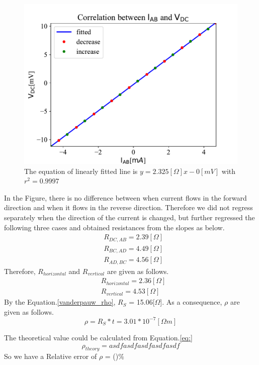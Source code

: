 \documentclass[5p,sort&compress]{elsarticle}
\begin{document}
\begin{figure}[h]
\centering
\includegraphics[width=.5\textwidth]{platinum_ABDC_VI.pdf}
\caption{The equation of linearly fitted line is $y = 2.325[\Omega]x - 0[mV]$ with $r^2 = 0.9997$}
\label{fig:ABDC}
\end{figure}
In the Figure, there is no difference between when current flows in the forward direction and when it flows in the reverse direction. Therefore we did not regress separately when the direction of the current is changed, but further regressed the following three cases and obtained resistances from the slopes as below.
\begin{align*}
    &R_{DC, AB} = 2.39[\Omega]\\
    &R_{BC, AD} = 4.49[\Omega]\\
    &R_{AD, BC} = 4.56[\Omega]
\end{align*}
Therefore, $R_{horizontal}$ and $R_{vertical}$ are given as follows.
\begin{align*}
&R_{horizontal} = 2.36[\Omega]\\
&R_{vertical} = 4.53[\Omega]
\end{align*}
By the Equation.\ref{vanderpauw_rho}, $R_{S}$ = 15.06[$\Omega$]. As a consequence, $\rho$ are given as follows.
\begin{equation}
    \rho = R_{S} * t = 3.01*10^{-7}[\Omega m]
\end{equation}

The theoretical value could be calculated from Equation.\ref{eq:} 
\begin{equation}
    {\rho}_{theory} = asdfasdfasdfasdfasdf
\end{equation}
So we have a Relative error of $\rho$ = ()$\%$
\end{document}

